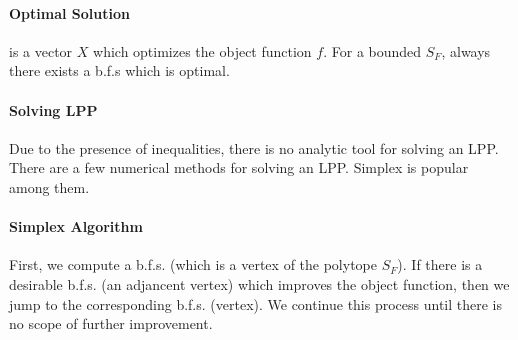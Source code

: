 \paragraph{Optimal Solution} is a vector $X$ which optimizes the object function $f$. For a bounded $S_F$, always there exists a b.f.s which is optimal.

\paragraph{Solving LPP} Due to the presence of inequalities, there is no analytic tool for solving an LPP. There are a few numerical methods for solving an LPP. Simplex is popular among them.

\paragraph{Simplex Algorithm}
	First, we compute a b.f.s. (which is a vertex of the polytope $S_F$). If there is a desirable b.f.s. (an  adjancent vertex) which improves the object function, then we jump to the corresponding b.f.s. (vertex). We continue this process until there is no scope of further improvement.

